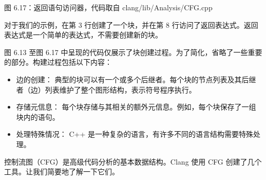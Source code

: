 \begin{center}
图 6.17：返回语句访问器，代码取自 clang/lib/Analysis/CFG.cpp
\end{center}

对于我们的示例，在第 3 行创建了一个块，并在第 8 行访问了返回表达式。返回表达式是一个简单的表达式，不需要创建新的块。

图 6.13 至图 6.17 中呈现的代码仅展示了块创建过程。为了简化，省略了一些重要的部分。构建过程包括以下内容：

\begin{itemize}
\item
边的创建： 典型的块可以有一个或多个后继者。每个块的节点列表及其后继者（边）列表维护了整个图形结构，表示符号程序执行。

\item
存储元信息： 每个块存储与其相关的额外元信息。例如，每个块保存了一组块内的语句。

\item
处理特殊情况： C++ 是一种复杂的语言，有许多不同的语言结构需要特殊处理。
\end{itemize}

控制流图（CFG）是高级代码分析的基本数据结构。Clang 使用 CFG 创建了几个工具。让我们简要地了解一下它们。

















